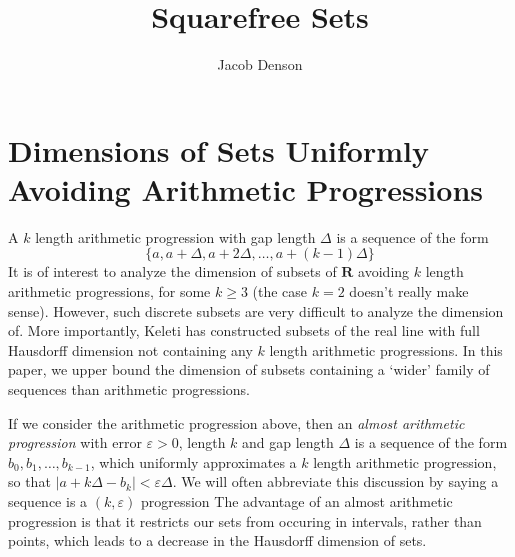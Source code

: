 \documentclass{article}
\title{Squarefree Sets}
\author{Jacob Denson}
\theoremstyle{plain}
\theoremstyle{plain}
\begin{document}
\maketitle

\tableofcontents

\section{Dimensions of Sets Uniformly Avoiding Arithmetic Progressions}

A $k$ length arithmetic progression with gap length $\Delta$ is a sequence of the form
%
\[ \{ a, a + \Delta, a + 2 \Delta, \dots, a + (k-1) \Delta \} \]
%
It is of interest to analyze the dimension of subsets of $\mathbf{R}$ avoiding $k$ length arithmetic progressions, for some $k \geq 3$ (the case $k = 2$ doesn't really make sense). However, such discrete subsets are very difficult to analyze the dimension of. More importantly, Keleti has constructed subsets of the real line with full Hausdorff dimension not containing any $k$ length arithmetic progressions. In this paper, we upper bound the dimension of subsets containing a `wider' family of sequences than arithmetic progressions.

If we consider the arithmetic progression above, then an {\it almost arithmetic progression} with error $\varepsilon > 0$, length $k$ and gap length $\Delta$ is a sequence of the form $b_0, b_1, \dots, b_{k-1}$, which uniformly approximates a $k$ length arithmetic progression, so that $|a + k \Delta - b_k| < \varepsilon \Delta$. We will often abbreviate this discussion by saying a sequence is a $(k,\varepsilon)$ progression The advantage of an almost arithmetic progression is that it restricts our sets from occuring in intervals, rather than points, which leads to a decrease in the Hausdorff dimension of sets.
\end{document}
